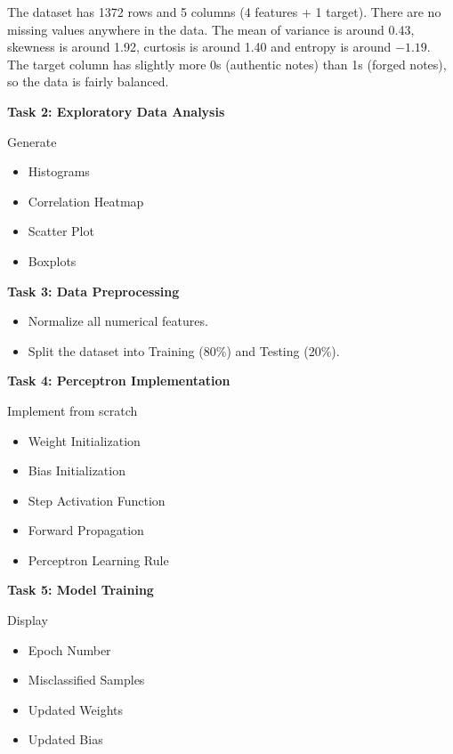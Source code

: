 \documentclass[11pt]{article}
\begin{document}
The dataset has 1372 rows and 5 columns (4 features + 1 target). There are no missing values anywhere in the data. The mean of variance is around 0.43, skewness is around 1.92, curtosis is around 1.40 and entropy is around $-1.19$. The target column has slightly more 0s (authentic notes) than 1s (forged notes), so the data is fairly balanced.
\vspace{2mm}

\textbf{Task 2: Exploratory Data Analysis}

Generate

\begin{itemize}
\item Histograms
\item Correlation Heatmap
\item Scatter Plot
\item Boxplots
\end{itemize}

\vspace{2mm}

\textbf{Task 3: Data Preprocessing}

\begin{itemize}
\item Normalize all numerical features.
\item Split the dataset into Training (80\%) and Testing (20\%).
\end{itemize}

\vspace{2mm}

\textbf{Task 4: Perceptron Implementation}

Implement from scratch

\begin{itemize}
\item Weight Initialization
\item Bias Initialization
\item Step Activation Function
\item Forward Propagation
\item Perceptron Learning Rule
\end{itemize}

\vspace{2mm}

\textbf{Task 5: Model Training}

Display

\begin{itemize}
\item Epoch Number
\item Misclassified Samples
\item Updated Weights
\item Updated Bias
\end{itemize}
\end{document}
